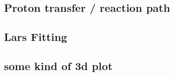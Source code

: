 \documentclass{article}
\begin{document}
\subsection{Proton transfer / reaction path}



\subsection{Lars Fitting}



\subsection{some kind of 3d plot}








\end{document}
